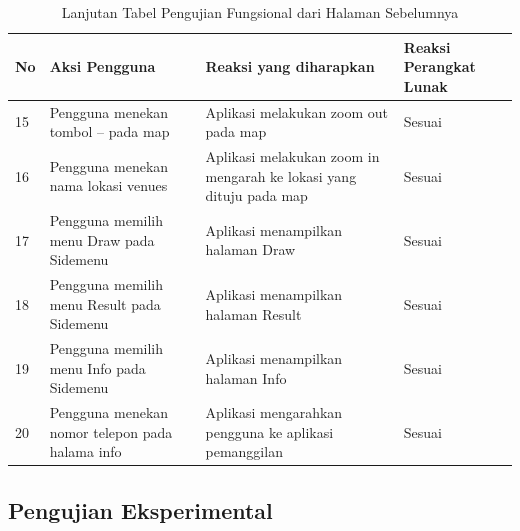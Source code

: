 \begin{table}[H]
\caption{Lanjutan Tabel Pengujian Fungsional dari Halaman Sebelumnya}
\label{table:tabelPengujianFungsional}
\begin{tabular}{|p{0.3cm}|p{5.7cm}|p{5.7cm}|p{3cm}|}
\hline
No & Aksi Pengguna                                                                      & Reaksi yang diharapkan                                                               & Reaksi Perangkat Lunak \\ \hline
15 & Pengguna menekan tombol – pada map                                                 & Aplikasi melakukan zoom out pada map                                                 & Sesuai                 \\ \hline
16 & Pengguna menekan nama lokasi venues                                                & Aplikasi melakukan zoom in mengarah ke lokasi yang dituju pada map                   & Sesuai                 \\ \hline
17 & Pengguna memilih menu Draw pada Sidemenu                                            & Aplikasi menampilkan halaman Draw                                                    & Sesuai                 \\ \hline
18 & Pengguna memilih menu Result pada Sidemenu                                          & Aplikasi menampilkan halaman Result                                                  & Sesuai                 \\ \hline
19 & Pengguna memilih menu Info pada Sidemenu                                            & Aplikasi menampilkan halaman Info                                                    & Sesuai                 \\ \hline
20 & Pengguna menekan nomor telepon pada halama info                                    & Aplikasi mengarahkan pengguna ke aplikasi pemanggilan                                & Sesuai                 \\ \hline
\end{tabular}
\end{table}
\subsection{Pengujian Eksperimental}
\label{subsec:pengujianEksperimental}

